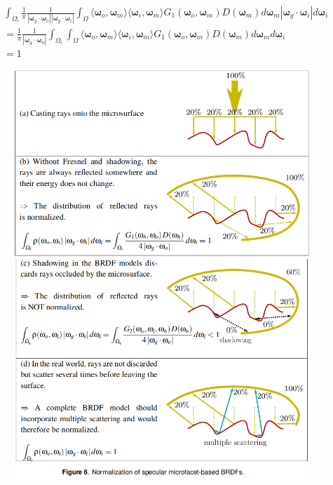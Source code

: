 \documentclass[a4j,xelatex,ja=standard]{bxjsarticle}
\begin{document}
\begin{equation}
    \begin{split}
        & \int_{\Omega_i} \frac{1}{\pi} \frac{1}{|\boldsymbol{\omega}_g \cdot \boldsymbol{\omega}_o| |\boldsymbol{\omega}_g \cdot \boldsymbol{\omega}_i|} \int_{\Omega} \langle \boldsymbol{\omega}_o, \boldsymbol{\omega}_m \rangle \langle \boldsymbol{\omega}_i, \boldsymbol{\omega}_m \rangle G_1(\boldsymbol{\omega}_o, \boldsymbol{\omega}_m) D(\boldsymbol{\omega}_m) d\boldsymbol{\omega}_m |\boldsymbol{\omega}_g \cdot \boldsymbol{\omega}_i| d\boldsymbol{\omega}_i \\
        &= \frac{1}{\pi} \frac{1}{|\boldsymbol{\omega}_g \cdot \boldsymbol{\omega}_o|} \int_{\Omega_i} \int_{\Omega} \langle \boldsymbol{\omega}_o, \boldsymbol{\omega}_m \rangle \langle \boldsymbol{\omega}_i, \boldsymbol{\omega}_m \rangle G_1(\boldsymbol{\omega}_o, \boldsymbol{\omega}_m) D(\boldsymbol{\omega}_m) d\boldsymbol{\omega}_m d\boldsymbol{\omega}_i \\
        &= 1
    \end{split}
    \label{eq:37}
\end{equation}

\begin{figure}
    \includegraphics[width=\textwidth]{Figure6_1.png}
    \includegraphics[width=\textwidth]{Figure6_2.png}
    \caption{}
    \label{fig:6}
\end{figure}
\end{document}
